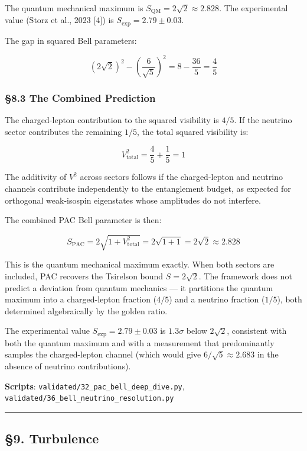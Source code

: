 \documentclass[
  11pt,
  a4paper]{article}
\begin{document}
The quantum mechanical maximum is
\(S_{\text{QM}} = 2\sqrt{2} \approx 2.828\). The experimental value
(Storz et al., 2023 {[}4{]}) is \(S_{\text{exp}} = 2.79 \pm 0.03\).

The gap in squared Bell parameters:

\[(2\sqrt{2})^2 - \left(\frac{6}{\sqrt{5}}\right)^2 = 8 - \frac{36}{5} = \frac{4}{5}\]

\subsubsection{§8.3 The Combined
Prediction}\label{the-combined-prediction}

The charged-lepton contribution to the squared visibility is \(4/5\). If
the neutrino sector contributes the remaining \(1/5\), the total squared
visibility is:

\[V^2_{\text{total}} = \frac{4}{5} + \frac{1}{5} = 1\]

The additivity of \(V^2\) across sectors follows if the charged-lepton
and neutrino channels contribute independently to the entanglement
budget, as expected for orthogonal weak-isospin eigenstates whose
amplitudes do not interfere.

The combined PAC Bell parameter is then:

\[S_{\text{PAC}} = 2\sqrt{1 + V^2_{\text{total}}} = 2\sqrt{1 + 1} = 2\sqrt{2} \approx 2.828\]

This is the quantum mechanical maximum exactly. When both sectors are
included, PAC recovers the Tsirelson bound \(S = 2\sqrt{2}\). The
framework does not predict a deviation from quantum mechanics --- it
partitions the quantum maximum into a charged-lepton fraction (\(4/5\))
and a neutrino fraction (\(1/5\)), both determined algebraically by the
golden ratio.

The experimental value \(S_{\text{exp}} = 2.79 \pm 0.03\) is
\(1.3\sigma\) below \(2\sqrt{2}\), consistent with both the quantum
maximum and with a measurement that predominantly samples the
charged-lepton channel (which would give \(6/\sqrt{5} \approx 2.683\) in
the absence of neutrino contributions).

\textbf{Scripts}: \texttt{validated/32\_pac\_bell\_deep\_dive.py},
\texttt{validated/36\_bell\_neutrino\_resolution.py}

\begin{center}\rule{0.5\linewidth}{0.5pt}\end{center}

\subsection{§9. Turbulence}\label{turbulence}
\end{document}
